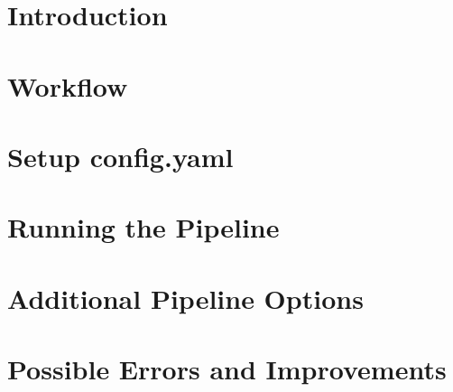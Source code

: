 \section{Introduction}
\label{section:intro}

\newpage

\section{Workflow}
\label{section:workflow}

\newpage

\section{Setup config.yaml}
\label{section:config}

\newpage

\section{Running the Pipeline}
\label{section:runPipeline}

\vfill

\section{Additional Pipeline Options}
\label{section:pipeOptions}

\newpage

\section{Possible Errors and Improvements}
\label{section:errorsAndImprovs}

\newpage
